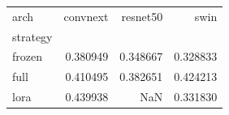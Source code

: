 \begin{tabular}{lrrr}
\toprule
arch & convnext & resnet50 & swin \\
strategy &  &  &  \\
\midrule
frozen & 0.380949 & 0.348667 & 0.328833 \\
full & 0.410495 & 0.382651 & 0.424213 \\
lora & 0.439938 & NaN & 0.331830 \\
\bottomrule
\end{tabular}
